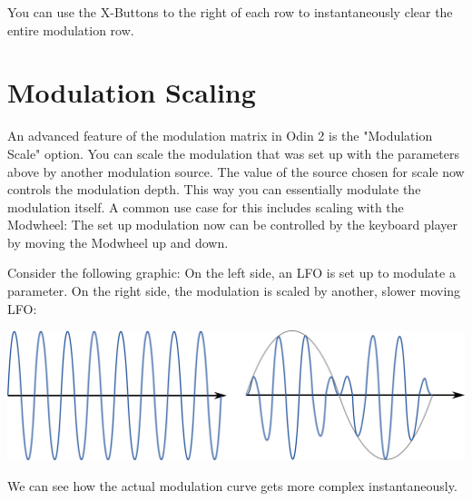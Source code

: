 


You can use the X-Buttons to the right of each row to instantaneously clear the entire modulation row.

\section{Modulation Scaling}

An advanced feature of the modulation matrix in Odin 2 is the "Modulation Scale" option. You can scale the modulation that was set up with the parameters above by another modulation source. The value of the source chosen for scale now controls the modulation depth. This way you can essentially modulate the modulation itself. A common use case for this includes scaling with the Modwheel: The set up modulation now can be controlled by the keyboard player by moving the Modwheel up and down.

\vspace{10mm}
Consider the following graphic: On the left side, an LFO is set up to modulate a parameter. On the right side, the modulation is scaled by another, slower moving LFO:
\begin{center}
    \includegraphics[width=\textwidth]{graphics/modulation_scale.png}
\end{center}
We can see how the actual modulation curve gets more complex instantaneously.



